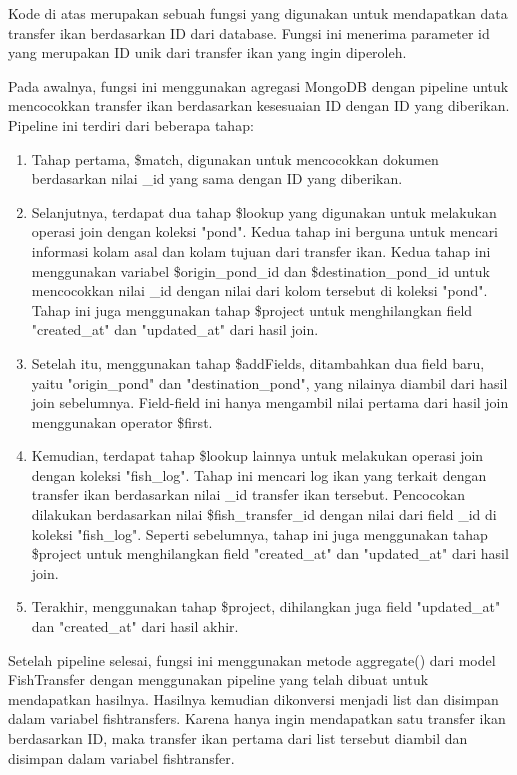 \begin{enumerate}[1.]
Kode di atas merupakan sebuah fungsi yang digunakan untuk mendapatkan data transfer ikan berdasarkan ID dari database. Fungsi ini menerima parameter id yang merupakan ID unik dari transfer ikan yang ingin diperoleh.

Pada awalnya, fungsi ini menggunakan agregasi MongoDB dengan pipeline untuk mencocokkan transfer ikan berdasarkan kesesuaian ID dengan ID yang diberikan. Pipeline ini terdiri dari beberapa tahap:

\begin{enumerate}
\item Tahap pertama, \$match, digunakan untuk mencocokkan dokumen berdasarkan nilai \_id yang sama dengan ID yang diberikan.

\item Selanjutnya, terdapat dua tahap \$lookup yang digunakan untuk melakukan operasi join dengan koleksi "pond". Kedua tahap ini berguna untuk mencari informasi kolam asal dan kolam tujuan dari transfer ikan. Kedua tahap ini menggunakan variabel \$origin\_pond\_id dan \$destination\_pond\_id untuk mencocokkan nilai \_id dengan nilai dari kolom tersebut di koleksi "pond". Tahap ini juga menggunakan tahap \$project untuk menghilangkan field "created\_at" dan "updated\_at" dari hasil join.

\item Setelah itu, menggunakan tahap \$addFields, ditambahkan dua field baru, yaitu "origin\_pond" dan "destination\_pond", yang nilainya diambil dari hasil join sebelumnya. Field-field ini hanya mengambil nilai pertama dari hasil join menggunakan operator \$first.

\item Kemudian, terdapat tahap \$lookup lainnya untuk melakukan operasi join dengan koleksi "fish\_log". Tahap ini mencari log ikan yang terkait dengan transfer ikan berdasarkan nilai \_id transfer ikan tersebut. Pencocokan dilakukan berdasarkan nilai \$fish\_transfer\_id dengan nilai dari field \_id di koleksi "fish\_log". Seperti sebelumnya, tahap ini juga menggunakan tahap \$project untuk menghilangkan field "created\_at" dan "updated\_at" dari hasil join.

\item Terakhir, menggunakan tahap \$project, dihilangkan juga field "updated\_at" dan "created\_at" dari hasil akhir.
\end{enumerate}

Setelah pipeline selesai, fungsi ini menggunakan metode aggregate() dari model FishTransfer dengan menggunakan pipeline yang telah dibuat untuk mendapatkan hasilnya. Hasilnya kemudian dikonversi menjadi list dan disimpan dalam variabel fishtransfers. Karena hanya ingin mendapatkan satu transfer ikan berdasarkan ID, maka transfer ikan pertama dari list tersebut diambil dan disimpan dalam variabel fishtransfer.


\end{enumerate}
